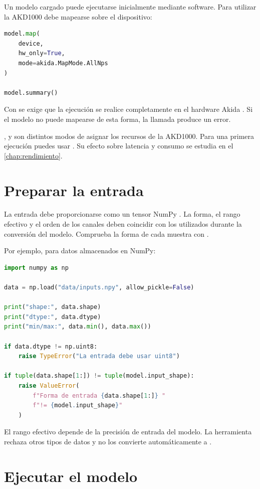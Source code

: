 Un modelo cargado puede ejecutarse inicialmente mediante software. Para utilizar la AKD1000
debe mapearse sobre el dispositivo:

\begin{lstlisting}[language=Python]
model.map(
    device,
    hw_only=True,
    mode=akida.MapMode.AllNps
)

model.summary()
\end{lstlisting}

Con  se exige que la ejecución se realice completamente en el hardware
Akida \cite{brainchip_akida_guide}. Si el modelo no puede mapearse de esta forma, la llamada
produce un error.

,  y  son distintos modos de asignar los recursos
de la AKD1000. Para una primera ejecución puedes usar . Su efecto sobre
latencia y consumo se estudia en el \cref{chap:rendimiento}.

\section{Preparar la entrada}

La entrada debe proporcionarse como un tensor NumPy . La forma, el rango
efectivo y el orden de los canales deben coincidir con los utilizados durante
la conversión del modelo. Comprueba la forma de cada muestra con
.

Por ejemplo, para datos almacenados en NumPy:

\begin{lstlisting}[language=Python]
import numpy as np

data = np.load("data/inputs.npy", allow_pickle=False)

print("shape:", data.shape)
print("dtype:", data.dtype)
print("min/max:", data.min(), data.max())

if data.dtype != np.uint8:
    raise TypeError("La entrada debe usar uint8")

if tuple(data.shape[1:]) != tuple(model.input_shape):
    raise ValueError(
        f"Forma de entrada {data.shape[1:]} "
        f"!= {model.input_shape}"
    )
\end{lstlisting}

El rango efectivo depende de la precisión de entrada del modelo. La herramienta
rechaza otros tipos de datos y no los convierte automáticamente a .


\section{Ejecutar el modelo}

